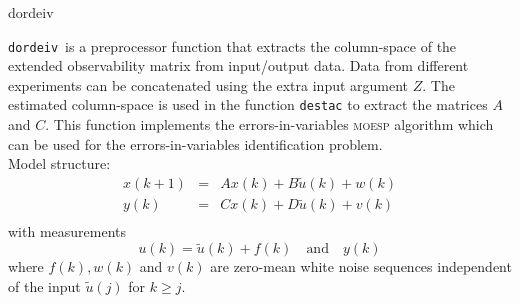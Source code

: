 \documentclass{book}
\newcommand{\moesp}{\textsc{moesp}}
\newcommand{\dordeiv}{\texttt{dordeiv}}
\newcommand{\destac}{\texttt{destac}}
\begin{document}
\begin{command}{dordeiv}
\begin{purpose}
  \dordeiv\ is a preprocessor function that extracts the column-space of
  the extended observability matrix from input/output data. Data from
  different experiments can be concatenated using the extra input
  argument $Z$. The estimated column-space is used in the function {\destac} 
  to extract the matrices $A$ and $C$. This function implements the
  errors-in-variables {\moesp} algorithm which can be used for the
  errors-in-variables identification problem.\\
  Model structure:
  \begin{eqnarray*}                  
    x(k+1) & = & Ax(k) + B\tilde{u}(k) + w(k) \\
    y(k) & = & Cx(k) + D\tilde{u}(k) +v(k)\\
  \end{eqnarray*}
  with measurements 
  \begin{displaymath}             
    u(k)  =  \tilde{u}(k) + f(k)\quad \mbox{and}\quad y(k)
  \end{displaymath}
  where $f(k), w(k)$ and $v(k)$ are zero-mean white noise sequences
  independent of the input $\tilde{u}(j)$ for $k \geq j$.
         

\end{purpose}
\end{command}
\end{document}
